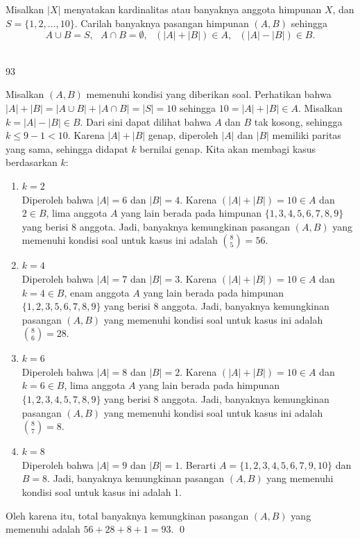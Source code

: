 \documentclass[12pt]{scrartcl}
\begin{document}
	\begin{soalbaru}
			Misalkan $|X|$ menyatakan kardinalitas atau banyaknya anggota himpunan $X$, dan $S=\{1,2,\dots,10\}$. Carilah banyaknya pasangan himpunan $(A,B)$ sehingga\\[-20pt]
			$$A \cup B = S,\text{ } A \cap B = \emptyset, \text{ } (|A|+|B|) \in A,\text{ } (|A|-|B|) \in B. $$\\[-30pt] %
			\begin{jawaban}
				93
			\end{jawaban}
			\begin{solusi}
			Misalkan $(A,B)$ memenuhi kondisi yang diberikan soal. Perhatikan bahwa $|A|+|B|=|A \cup B|+|A \cap B|=|S|=10$ sehingga $10=|A|+|B| \in A$. Misalkan $k=|A|-|B| \in B$. Dari sini dapat dilihat bahwa $A$ dan $B$ tak kosong, sehingga $k \le 9-1 <10$. Karena $|A|+|B|$ genap, diperoleh $|A|$ dan $|B|$ memiliki paritas yang sama, sehingga didapat $k$ bernilai genap. Kita akan membagi kasus berdasarkan $k$:
			\begin{enumerate}
			\item $k=2$ \\
			Diperoleh bahwa $|A|=6$ dan $|B|=4$. Karena $(|A|+|B|)=10 \in A$ dan $2 \in B$, lima anggota $A$ yang lain berada pada himpunan $\{1,3,4,5,6,7,8,9\}$ yang berisi 8 anggota. Jadi, banyaknya kemungkinan pasangan $(A,B)$ yang memenuhi kondisi soal untuk kasus ini adalah ${8 \choose 5 }=56$.
			
			\item $k=4$ \\
						Diperoleh bahwa $|A|=7$ dan $|B|=3$. Karena $(|A|+|B|)=10 \in A$ dan $k=4 \in B$, enam anggota $A$ yang lain berada pada himpunan $\{1,2,3,5,6,7,8,9\}$ yang berisi 8 anggota. Jadi, banyaknya kemungkinan pasangan $(A,B)$ yang memenuhi kondisi soal untuk kasus ini adalah ${8 \choose 6 }=28$.
						
			\item $k=6$ \\
						Diperoleh bahwa $|A|=8$ dan $|B|=2$. Karena $(|A|+|B|)=10 \in A$ dan $k=6 \in B$, lima anggota $A$ yang lain berada pada himpunan $\{1,2,3,4,5,7,8,9\}$ yang berisi 8 anggota. Jadi, banyaknya kemungkinan pasangan $(A,B)$ yang memenuhi kondisi soal untuk kasus ini adalah ${8 \choose 7 }=8$.
				
			\item $k=8$ \\
						Diperoleh bahwa $|A|=9$ dan $|B|=1$. Berarti $A=\{1,2,3,4,5,6,7,9,10\}$ dan $B={8}$. Jadi, banyaknya kemungkinan pasangan $(A,B)$ yang memenuhi kondisi soal untuk kasus ini adalah 1.
						
			\end{enumerate}
			
			Oleh karena itu, total banyaknya kemungkinan pasangan $(A,B)$ yang memenuhi adalah $56+28+8+1=93.$ \qed
			\end{solusi}
			\vspace{10pt}
		\end{soalbaru}
\end{document}
